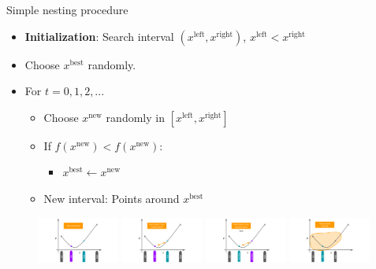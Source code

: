 \documentclass[11pt,compress,t,notes=noshow, xcolor=table]{beamer}
\begin{document}
\begin{vbframe}{Simple nesting procedure}

\begin{itemize}
\item\textbf{Initialization}: Search interval  $(x^{\text{left}}, x^{\text{right}})$, $x^{\text{left}} < x^{\text{right}}$
\item Choose $x^{\text{best}}$ randomly.
\item For $t = 0, 1, 2, ...$
\begin{itemize}
    \item Choose $x^{\text{new}}$ randomly in $[x^{\text{left}}, x^{\text{right}}]$
    \item If $f(x^{\text{new}}) < f(x^{\text{new}})$:
    \begin{itemize}
        \item $x^{\text{best}} \leftarrow x^{\text{new}}$
    \end{itemize}
    \item New interval: Points around $x^{\text{best}}$
\end{itemize}
\end{itemize}

\lz 

\begin{figure}
    \centering
    \includegraphics[width=0.24\textwidth]{figure_man/golden-ratio-2.png}     \includegraphics[width=0.24\textwidth]{figure_man/golden-ratio-3.png}
    \includegraphics[width=0.24\textwidth]{figure_man/golden-ratio-4.png}
    \includegraphics[width=0.24\textwidth]{figure_man/golden-ratio-5.png}
\end{figure}

\end{vbframe}
\end{document}
